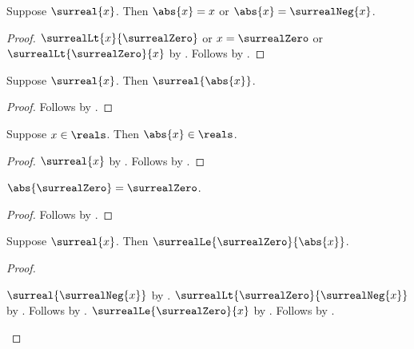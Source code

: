 \begin{proposition}\label{surreal_abs_cases}
    Suppose $\surreal{x}$.
    Then $\abs{x}=x$ or $\abs{x}=\surrealNeg{x}$.
\end{proposition}
\begin{proof}
    $\surrealLt{x}{\surrealZero}$ or $x=\surrealZero$ or
        $\surrealLt{\surrealZero}{x}$
        by .
    Follows by
        .
\end{proof}

\begin{proposition}\label{surreal_abs_is_surreal}
    Suppose $\surreal{x}$.
    Then $\surreal{\abs{x}}$.
\end{proposition}
\begin{proof}
    Follows by
        .
\end{proof}

\begin{proposition}\label{surreal_real_abs_closed}
    Suppose $x\in\reals$.
    Then $\abs{x}\in\reals$.
\end{proposition}
\begin{proof}
    $\surreal{x}$ by .
    Follows by
        .
\end{proof}

\begin{proposition}\label{surreal_abs_zero}
    $\abs{\surrealZero}=\surrealZero$.
\end{proposition}
\begin{proof}
    Follows by
        .
\end{proof}

\begin{proposition}\label{surreal_abs_nonnegative_value}
    Suppose $\surreal{x}$.
    Then $\surrealLe{\surrealZero}{\abs{x}}$.
\end{proposition}
\begin{proof}
    \begin{byCase}
        $\surreal{\surrealNeg{x}}$
            by .
        $\surrealLt{\surrealZero}{\surrealNeg{x}}$
            by
            .
        Follows by .
        $\surrealLe{\surrealZero}{x}$
            by .
        Follows by .
    \end{byCase}
\end{proof}

